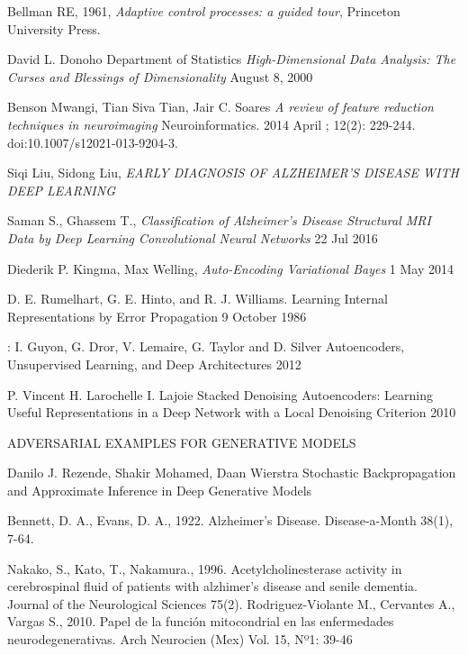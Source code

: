 \begin{thebibliography}{9}
Bellman RE, 
1961,
\textit{Adaptive control processes: a guided tour}, Princeton
University Press.


	David L. Donoho
	Department of Statistics
	\textit{High-Dimensional Data Analysis: The Curses and Blessings of Dimensionality}
	August 8, 2000

	Benson Mwangi, 
	Tian Siva Tian,  
	Jair C. Soares
	\textit{A review of feature reduction techniques in neuroimaging}
	Neuroinformatics. 2014 April ; 12(2): 229-244. doi:10.1007/s12021-013-9204-3.

	Siqi Liu, 
	Sidong Liu,
	\textit{EARLY DIAGNOSIS OF ALZHEIMER'S DISEASE WITH DEEP LEARNING}

	Saman S., 
	Ghassem T.,
	\textit{Classification of Alzheimer's Disease Structural MRI Data by Deep Learning Convolutional Neural Networks}
	22 Jul 2016

	Diederik P. Kingma,
	Max Welling,
	\textit{Auto-Encoding Variational Bayes}
	1 May 2014

	 D. E. Rumelhart, G. E. Hinto, and R. J. Williams. 
	 Learning Internal Representations by Error Propagation
	 9 October 1986

	: I. Guyon, 
	G. Dror, 
	V. Lemaire, 
	G. Taylor and 
	D. Silver
	Autoencoders, Unsupervised Learning, and Deep Architectures
	2012

	P. Vincent
	H. Larochelle
	I. Lajoie
	Stacked Denoising Autoencoders: Learning Useful Representations in a Deep Network with a Local Denoising Criterion
	2010

ADVERSARIAL EXAMPLES FOR GENERATIVE MODELS

	Danilo J. Rezende, 
	Shakir Mohamed, 
	Daan Wierstra
	Stochastic Backpropagation and Approximate Inference in Deep Generative Models

	Bennett, D. A.,
	Evans, D. A., 
	1922.
	Alzheimer's Disease.
	Disease-a-Month 38(1), 7-64.

	Nakako, S.,
	Kato, T.,
	Nakamura.,
	1996.
	Acetylcholinesterase activity in cerebrospinal fluid of patients with alzhimer's disease and senile dementia.
	Journal of the Neurological Sciences
	75(2).
	Rodriguez-Violante M.,
	Cervantes A.,
	Vargas S.,
	2010.
	Papel de la función mitocondrial en las enfermedades neurodegenerativas.
	Arch Neurocien (Mex)  Vol. 15, Nº1: 39-46


\end{thebibliography}
